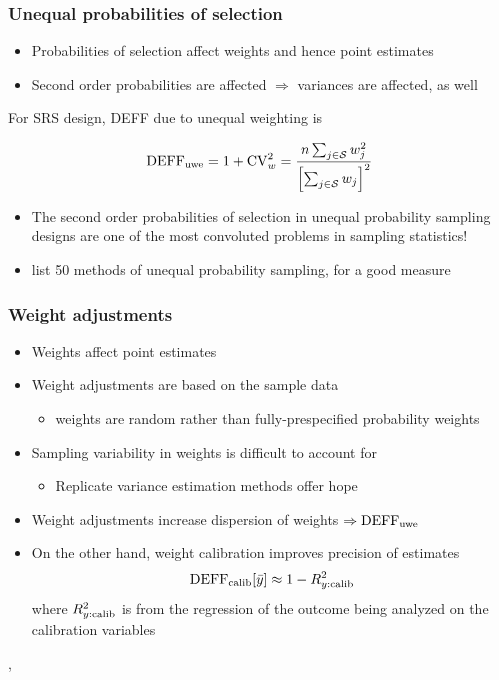 \documentclass{beamer}
\begin{document}
\begin{frame}\frametitle{Unequal probabilities of selection}

\begin{itemize}
    \item Probabilities of selection affect weights and hence point estimates
    \item Second order probabilities are affected $\Rightarrow$ variances are affected, as well
\end{itemize}

\medskip

For SRS design, DEFF due to unequal weighting is

$$
{\rm DEFF}_{\rm uwe} = 1 + {\rm CV}_w^2 = \frac{n \sum_{j\in\mathcal{S}} w_j^2}{\Bigl[\sum_{j\in\mathcal{S}} w_j\Bigr]^2}
$$

\medskip

\begin{itemize}
    \item The second order probabilities of selection in unequal probability sampling designs
        are one of the most convoluted problems in sampling statistics!
    \item \citet{brewer:hanif:1983} list 50 methods of unequal probability sampling, for a good measure
\end{itemize}


\end{frame}

\begin{frame}\frametitle{Weight adjustments}

\begin{itemize}
    \item Weights affect point estimates
    \item Weight adjustments are based on the sample data
        \begin{itemize} \item weights are random rather than fully-prespecified probability weights \end{itemize}
    \item Sampling variability in weights is difficult to account for
        \begin{itemize}
            \item Replicate variance estimation methods offer hope
        \end{itemize}
    \item Weight adjustments increase dispersion of weights $\Rightarrow {\rm DEFF}_{\rm uwe}$
    \item On the other hand, weight calibration improves precision of estimates
            $$
            {\rm DEFF}_{\rm calib} [\bar y] \approx 1 - R^2_{y:{\rm calib}}
            $$
            where $R^2_{y:{\rm calib}}$ is from the regression of the outcome being analyzed on the calibration variables
\end{itemize}

\medskip

\citet{deville:sarndal:1992}, 
\citet{devaud:tille:2019}

\end{frame}
\end{document}
